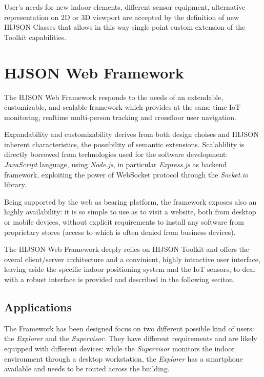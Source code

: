 \documentclass{sig-alternate}
\begin{document}
User's needs for new indoor elements, different sensor equipment,
alternative representation on 2D or 3D viewport are accepted by the
definition of new HIJSON Classes that allows in this way single point
custom extension of the Toolkit capabilities.

\section{HJSON Web Framework}\label{hjson-web-framework}

The HJSON Web Framework responds to the needs of an extendable,
customizable, and scalable framework which provides at the same time IoT
monitoring, realtime multi-person tracking and crossfloor user
navigation.

Expandability and customizability derives from both design choises and
HIJSON inherent characteristics, the possibility of semantic extensions.
Scalablility is directly borrowed from technologies used for the
software development: \emph{JavaScript} language, using \emph{Node.js},
in particular \emph{Express.js} as backend framework, exploiting the
power of WebSocket protocol through the \emph{Socket.io} library.

Being supported by the web as bearing platform, the framework exposes
also an highly availability: it is so simple to use as to visit a
website, both from desktop or mobile devices, without explicit
requirements to install any software from proprietary stores (access to
which is often denied from business devices).

The HIJSON Web Framework deeply relies on HIJSON Toolkit and offers the
overal client/server architecture and a convinient, highly intractive
user interface, leaving aside the specific indoor positioning system and
the IoT sensors, to deal with a robust interface is provided and
described in the following seciton.

\subsection{Applications}\label{applications}

The Framework has been designed focus on two different possible kind of
users: the \emph{Explorer} and the \emph{Supervisor}. They have
different requirements and are likely equipped with different devices:
while the \emph{Supervisor} monitors the indoor environment through a
desktop workstation, the \emph{Explorer} has a smartphone available and
needs to be routed across the building.
\end{document}
